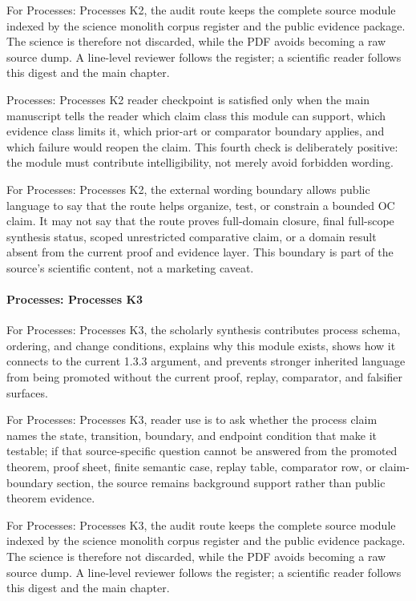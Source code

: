 For Processes: Processes K2, the audit route keeps the complete source module indexed by the science monolith corpus register and the public evidence package. The science is therefore not discarded, while the PDF avoids becoming a raw source dump. A line-level reviewer follows the register; a scientific reader follows this digest and the main chapter.


Processes: Processes K2 reader checkpoint is satisfied only when the main manuscript tells the reader which claim class this module can support, which evidence class limits it, which prior-art or comparator boundary applies, and which failure would reopen the claim. This fourth check is deliberately positive: the module must contribute intelligibility, not merely avoid forbidden wording.


For Processes: Processes K2, the external wording boundary allows public language to say that the route helps organize, test, or constrain a bounded OC claim. It may not say that the route proves full-domain closure, final full-scope synthesis status, scoped unrestricted comparative claim, or a domain result absent from the current proof and evidence layer. This boundary is part of the source's scientific content, not a marketing caveat.


\paragraph{Processes: Processes K3}

For Processes: Processes K3, the scholarly synthesis contributes process schema, ordering, and change conditions, explains why this module exists, shows how it connects to the current 1.3.3 argument, and prevents stronger inherited language from being promoted without the current proof, replay, comparator, and falsifier surfaces.


For Processes: Processes K3, reader use is to ask whether the process claim names the state, transition, boundary, and endpoint condition that make it testable; if that source-specific question cannot be answered from the promoted theorem, proof sheet, finite semantic case, replay table, comparator row, or claim-boundary section, the source remains background support rather than public theorem evidence.


For Processes: Processes K3, the audit route keeps the complete source module indexed by the science monolith corpus register and the public evidence package. The science is therefore not discarded, while the PDF avoids becoming a raw source dump. A line-level reviewer follows the register; a scientific reader follows this digest and the main chapter.


